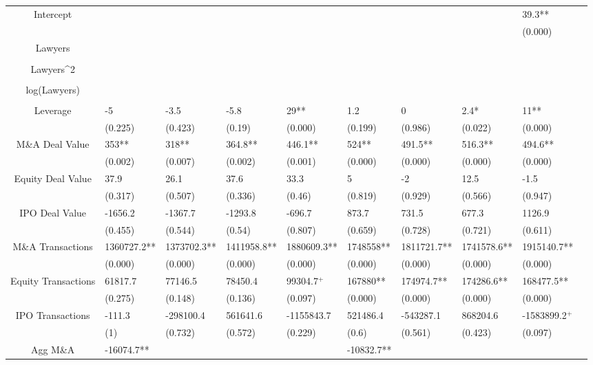 \documentclass{article}
\begin{document}
\begin{table}[H]
\begin{tabular}{|clllllllll|}
Intercept &  &  &  &  &  &  &  & 39.3** & \\ 
   &  &  &  &  &  &  &  & (0.000) & \\ 
  Lawyers &  &  &  &  &  &  &  &  & \\ 
   &  &  &  &  &  &  &  &  & \\ 
  Lawyers^2 &  &  &  &  &  &  &  &  & \\ 
   &  &  &  &  &  &  &  &  & \\ 
  log(Lawyers) &  &  &  &  &  &  &  &  & \\ 
   &  &  &  &  &  &  &  &  & \\ 
  Leverage & -5 & -3.5 & -5.8 & 29** & 1.2 & 0 & 2.4* & 11** & \\ 
   & (0.225) & (0.423) & (0.19) & (0.000) & (0.199) & (0.986) & (0.022) & (0.000) & \\ 
  M\&A Deal Value & 353** & 318** & 364.8** & 446.1** & 524** & 491.5** & 516.3** & 494.6** & \\ 
   & (0.002) & (0.007) & (0.002) & (0.001) & (0.000) & (0.000) & (0.000) & (0.000) & \\ 
  Equity Deal Value & 37.9 & 26.1 & 37.6 & 33.3 & 5 & -2 & 12.5 & -1.5 & \\ 
   & (0.317) & (0.507) & (0.336) & (0.46) & (0.819) & (0.929) & (0.566) & (0.947) & \\ 
  IPO Deal Value & -1656.2 & -1367.7 & -1293.8 & -696.7 & 873.7 & 731.5 & 677.3 & 1126.9 & \\ 
   & (0.455) & (0.544) & (0.54) & (0.807) & (0.659) & (0.728) & (0.721) & (0.611) & \\ 
  M\&A Transactions & 1360727.2** & 1373702.3** & 1411958.8** & 1880609.3** & 1748558** & 1811721.7** & 1741578.6** & 1915140.7** & \\ 
   & (0.000) & (0.000) & (0.000) & (0.000) & (0.000) & (0.000) & (0.000) & (0.000) & \\ 
  Equity Transactions & 61817.7 & 77146.5 & 78450.4 & 99304.7$^{+}$ & 167880** & 174974.7** & 174286.6** & 168477.5** & \\ 
   & (0.275) & (0.148) & (0.136) & (0.097) & (0.000) & (0.000) & (0.000) & (0.000) & \\ 
  IPO Transactions & -111.3 & -298100.4 & 561641.6 & -1155843.7 & 521486.4 & -543287.1 & 868204.6 & -1583899.2$^{+}$ & \\ 
   & (1) & (0.732) & (0.572) & (0.229) & (0.6) & (0.561) & (0.423) & (0.097) & \\ 
  Agg M\&A & -16074.7** &  &  &  & -10832.7** &  &  &  & \\ 

\end{tabular}
\end{table}
\end{document}
